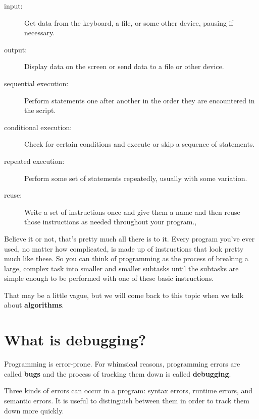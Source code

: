 \documentclass[10pt]{book}
\begin{document}
\begin{description}

\item[input:] Get data from the keyboard, a file, or some
other device, pausing if necessary.

\item[output:] Display data on the screen or send data to a
file or other device.

\item[sequential execution:] Perform statements one after
another in the order they are encountered in the script.

\item[conditional execution:] Check for certain conditions and
execute or skip a sequence of statements.

\item[repeated execution:] Perform some set of statements 
repeatedly, usually with
some variation.

\item[reuse:] Write a set of instructions once and give them a name
and then reuse those instructions as needed throughout your program.,

\end{description}

Believe it or not, that's pretty much all there is to it.  Every
program you've ever used, no matter how complicated, is made up of
instructions that look pretty much like these.  So you can think of
programming as the process of breaking a large, complex task
into smaller and smaller subtasks until the subtasks are
simple enough to be performed with one of these basic instructions.


That may be a little vague, but we will come back to this topic
when we talk about {\bf algorithms}.

\section{What is debugging?}

Programming is error-prone.  For whimsical reasons, programming errors
are called {\bf bugs} and the process of tracking them down is called
{\bf debugging}.


Three kinds of errors can occur in a program: syntax errors, runtime 
errors, and semantic errors. It is useful
to distinguish between them in order to track them down more quickly.
\end{document}
